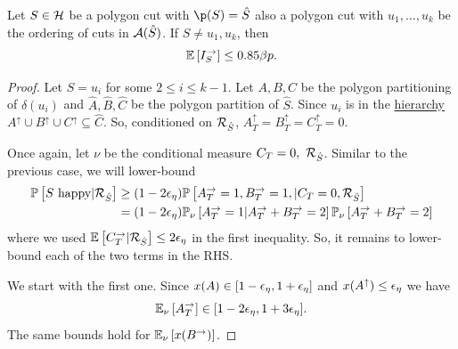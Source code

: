  


 
 
 
 \begin{lemma}\label{lem:middleISright}
Let $S\in\mathcal{H}$ be a polygon cut with $\p(S)=\hat{S}$ also a polygon cut with $u_1,\dots,u_k$ be the ordering of cuts in ${\cal A}(\hat{S})$. If $S\neq u_1,u_k$, then 
$$ {\mathbb{E}}\left[I_S^\rightarrow\right] \leq  0.85 \beta p.$$
\end{lemma}

 
\begin{proof}
Let $S=u_i$ for some $2\leq i\leq k-1$.
 Let $A,B,C$ be the polygon partitioning of  $\delta(u_i)$ and $\hat{A},\hat{B},\hat{C}$ be the polygon partition of $\hat{S}$.
 Since $u_i$ is in the \hyperlink{tar:hierarchy}{hierarchy} $A^\uparrow\cup B^\uparrow\cup C^\uparrow\subseteq \hat{C}$.
 So, conditioned on ${\mathcal{R}}_{\hat{S}}$, $A^\uparrow_T= B^\uparrow_T= C^\uparrow_T=0$.
 
Once again, let $\nu$ be the conditional measure $C_T=0,~ {\mathcal{R}}_{\hat{S}}$. Similar to the previous case, we will lower-bound
\begin{align}
{\mathbb{P}}\left[S\text{ happy} |{\mathcal{R}}_{\hat{S}}\right] &\geq (1-2{\epsilon}_\eta) {\mathbb{P}}\left[A^\rightarrow_T=1,B^\rightarrow_T=1,| C_T=0,  {\mathcal{R}}_{\hat{S}}\right]\nonumber\\
&=(1-2{\epsilon}_\eta) {\mathbb{P}}_{\nu}\left[A^\rightarrow_T=1 | A^\rightarrow_T+B^\rightarrow_T=2\right]{\mathbb{P}}_{\nu}\left[A^\rightarrow_T+B^\rightarrow_T=2 \right]
\label{eq:bbhappyGreduced}
\end{align}
where we used ${\mathbb{E}}\left[C^\rightarrow_T | {\mathcal{R}}_{\hat{S}}\right] \leq 2{\epsilon}_\eta$ in the first inequality. 
So, it remains to lower-bound each of the two terms in the RHS. 

We start with the first one. Since $x(A)\in [1-{\epsilon}_\eta,1+{\epsilon}_\eta]$ and $x(A^\uparrow)\leq {\epsilon}_\eta$ we have
$$ \EE{\nu}{A^\rightarrow_T}\in [1-2\eps_\eta,1+3\eps_\eta]. %
$$
The same bounds hold for ${\mathbb{E}}_{\nu}\left[x(B^\rightarrow)\right]$. 


\end{proof}
